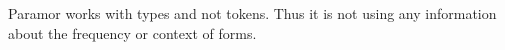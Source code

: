 \documentclass[11pt]{article}
\begin{document}
\noindent
Paramor works with types and not tokens. Thus it is not using any information about the frequency or context of forms.




%

%
%
%
%
%
\end{document}

